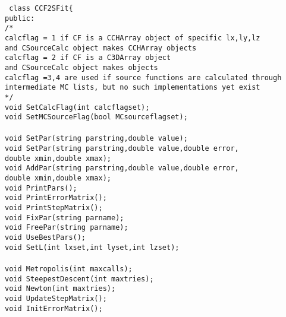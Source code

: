 \documentclass[10pt]{article}
\def\tab{\hspace*{9pt}}
\begin{document}
{\tt 
class CCF2SFit\{\\
\tab public:\\
\tab\tab    /*\\
\tab\tab    calcflag = 1 if CF is a CCHArray object of specific lx,ly,lz\\
\tab\tab      and CSourceCalc object makes CCHArray objects\\
\tab\tab    calcflag = 2 if CF is a C3DArray object \\
\tab\tab      and CSourceCalc object makes  objects\\
\tab\tab    calcflag =3,4 are used if source functions are calculated through\\
\tab\tab      intermediate MC lists, but no such implementations yet exist\\
\tab\tab  */ \\
\tab\tab  void SetCalcFlag(int calcflagset);\\
\tab\tab  void SetMCSourceFlag(bool MCsourceflagset);\\
\\
\tab\tab  void SetPar(string parstring,double value);\\
\tab\tab  void SetPar(string parstring,double value,double error,\\
\tab\tab	      double xmin,double xmax);\\
\tab\tab  void AddPar(string parstring,double value,double error,\\
\tab\tab	      double xmin,double xmax);\\
\tab\tab  void PrintPars();\\
\tab\tab  void PrintErrorMatrix();\\
\tab\tab  void PrintStepMatrix();\\
\tab\tab  void FixPar(string parname);\\
\tab\tab  void FreePar(string parname);\\
\tab\tab  void UseBestPars();\\
\tab\tab  void SetL(int lxset,int lyset,int lzset);\\
\\
\tab\tab  void Metropolis(int maxcalls);\\
\tab\tab  void SteepestDescent(int maxtries);\\
\tab\tab  void Newton(int maxtries);\\
\tab\tab  void UpdateStepMatrix();\\
\tab\tab  void InitErrorMatrix();\\
\\
}
\end{document}
